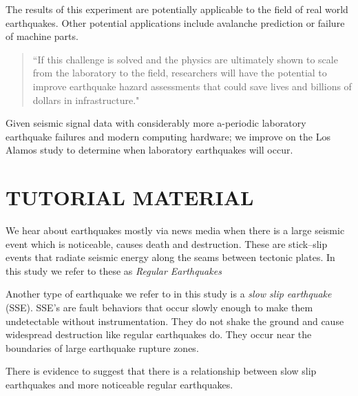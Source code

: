 \documentclass[]{llncs}
\begin{document}
The results of this experiment are potentially applicable to the field of real world earthquakes. Other potential applications include avalanche prediction or failure of machine parts.
\begin{quote}
	“If this challenge is solved and the physics are ultimately shown to scale from the laboratory to the field, researchers will have the potential to improve earthquake hazard assessments that could save lives and billions of dollars in infrastructure.\cite{kaggle}"
\end{quote}

Given seismic signal data with considerably more a-periodic laboratory earthquake failures and modern computing hardware; we improve on the Los Alamos study\cite{Bertrand} to determine when laboratory earthquakes will occur.





\section{TUTORIAL MATERIAL}
We hear about earthquakes mostly via news media when there is a large seismic event which is noticeable, causes death and destruction. These are stick–slip events that radiate seismic energy along the seams between tectonic plates. In this study we refer to these as {\em Regular Earthquakes} \par

Another type of earthquake we refer to in this study is a {\em slow slip earthquake} (SSE). SSE's are fault behaviors that occur slowly enough to make them undetectable without instrumentation. They do not shake the ground and cause widespread destruction like regular earthquakes do. They occur near the boundaries of large earthquake rupture zones\cite{Slip}. \par

There is evidence to suggest that there is a relationship between slow slip earthquakes and more noticeable regular earthquakes\cite{SlowSlip}. \par
\end{document}
